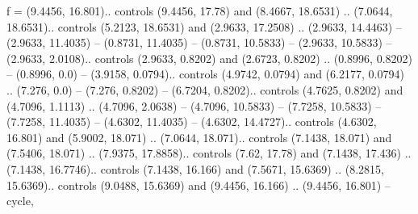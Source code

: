 f = {(9.4456, 16.801).. controls (9.4456, 17.78) and (8.4667, 18.6531) .. (7.0644, 18.6531).. controls (5.2123, 18.6531) and (2.9633, 17.2508) .. (2.9633, 14.4463) -- (2.9633, 11.4035) -- (0.8731, 11.4035) -- (0.8731, 10.5833) -- (2.9633, 10.5833) -- (2.9633, 2.0108).. controls (2.9633, 0.8202) and (2.6723, 0.8202) .. (0.8996, 0.8202) -- (0.8996, 0.0) -- (3.9158, 0.0794).. controls (4.9742, 0.0794) and (6.2177, 0.0794) .. (7.276, 0.0) -- (7.276, 0.8202) -- (6.7204, 0.8202).. controls (4.7625, 0.8202) and (4.7096, 1.1113) .. (4.7096, 2.0638) -- (4.7096, 10.5833) -- (7.7258, 10.5833) -- (7.7258, 11.4035) -- (4.6302, 11.4035) -- (4.6302, 14.4727).. controls (4.6302, 16.801) and (5.9002, 18.071) .. (7.0644, 18.071).. controls (7.1438, 18.071) and (7.5406, 18.071) .. (7.9375, 17.8858).. controls (7.62, 17.78) and (7.1438, 17.436) .. (7.1438, 16.7746).. controls (7.1438, 16.166) and (7.5671, 15.6369) .. (8.2815, 15.6369).. controls (9.0488, 15.6369) and (9.4456, 16.166) .. (9.4456, 16.801) -- cycle},

